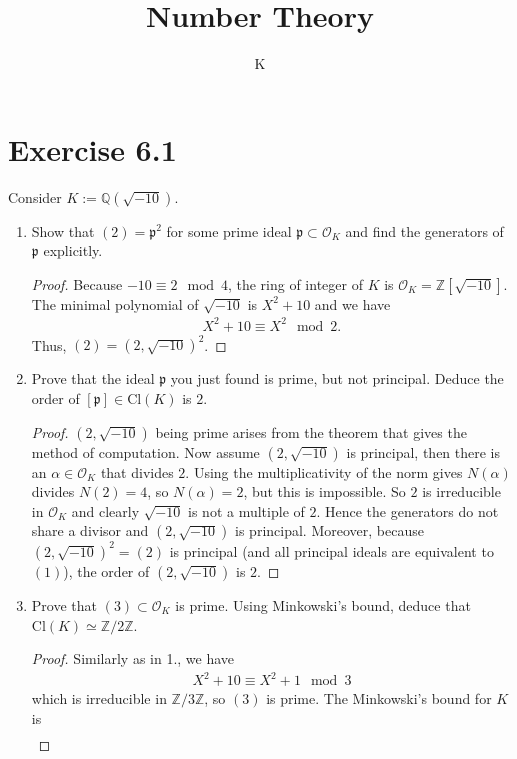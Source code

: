 \documentclass[a4paper]{article}
\title{Number Theory}
\author{K}
\begin{document}
\section*{Exercise 6.1}
Consider \(K := \mathbb{Q}(\sqrt{-10})\).
\begin{enumerate}
    \item Show that \((2) = \mathfrak{p}^2\) for some prime ideal \(\mathfrak{p} \subset \mathcal{O}_K\) and find the generators of \(\mathfrak{p}\) explicitly.
    \begin{proof}
        Because \(-10 \equiv 2 \mod{4}\), the ring of integer of \(K\) is \(\mathcal{O}_K = \mathbb{Z}[\sqrt{-10}]\). The minimal polynomial of \(\sqrt{-10}\) is \(X^2 + 10\) and we have
        \begin{align*}
            X^2 + 10 \equiv X^2 \mod{2} \text{.}
        \end{align*}
        Thus, \((2) = (2, \sqrt{-10})^2\).
    \end{proof}
    \item Prove that the ideal \(\mathfrak{p}\) you just found is prime, but not principal. Deduce the order of \([\mathfrak{p}] \in \mathrm{Cl}(K)\) is \(2\).
    \begin{proof}
        \((2, \sqrt{-10})\) being prime arises from the theorem that gives the method of computation. Now assume \((2, \sqrt{-10})\) is principal, then there is an \(\alpha \in \mathcal{O}_K\) that divides \(2\). Using the multiplicativity of the norm gives \(N(\alpha)\) divides \(N(2) = 4\), so \(N(\alpha) = 2\), but this is impossible. So \(2\) is irreducible in \(\mathcal{O}_K\) and clearly \(\sqrt{-10}\) is not a multiple of \(2\). Hence the generators do not share a divisor and \((2, \sqrt{-10})\) is principal. Moreover, because \((2, \sqrt{-10})^2 = (2)\) is principal (and all principal ideals are equivalent to \((1)\)), the order of \((2, \sqrt{-10})\) is \(2\).
    \end{proof}
        \item Prove that \((3) \subset \mathcal{O}_K\) is prime. Using Minkowski's bound, deduce that \(\mathrm{Cl}(K) \simeq \mathbb{Z}/2\mathbb{Z}\).
        \begin{proof}
            Similarly as in 1., we have
            \begin{align*}
                X^2 + 10 \equiv X^2 + 1 \mod{3}
            \end{align*}
            which is irreducible in \(\mathbb{Z}/3\mathbb{Z}\), so \((3)\) is prime. The Minkowski's bound for \(K\) is
            \begin{align*}

\end{align*}
\end{proof}
\end{enumerate}
\end{document}
